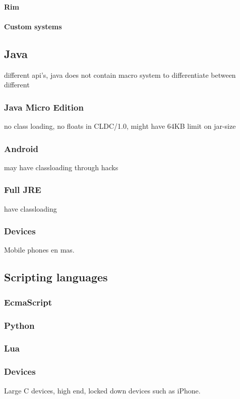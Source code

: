 \paragraph{Rim}
\paragraph{Custom systems}

\subsection{Java}
different api's, java does not contain macro system to differentiate between different 
\subsubsection{Java Micro Edition}
no class loading, 
no floats in CLDC/1.0,
might have 64KB limit on jar-size
\subsubsection{Android}
may have classloading through hacks
\subsubsection{Full JRE}
have classloading
\subsubsection{Devices}
Mobile phones en mas.


\subsection{Scripting languages}
\subsubsection{EcmaScript}
\subsubsection{Python}
\subsubsection{Lua}
\subsubsection{Devices}
Large C devices, high end, locked down devices such as iPhone.

